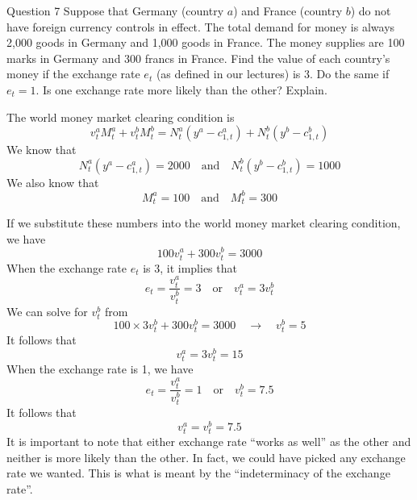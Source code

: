 \documentclass[a4paper]{article}
\newif\IfInSansMode
\numberwithin{equation}{section}
\numberwithin{figure}{section}
\begin{document}
	\begin{questionbox}{Question 7}
		Suppose that Germany (country \( a \)) and France (country \( b \)) do not have foreign currency controls in effect. The total demand for money is always 2,000 goods in Germany and 1,000 goods in France. The money supplies are 100 marks in Germany and 300 francs in France. Find the value of each country's money if the exchange rate \( e_t \) (as defined in our lectures) is 3. Do the same if \( e_t = 1 \). Is one exchange rate more likely than the other? Explain.
		\begin{explanationbox}
			The world money market clearing condition is
			\[
				v_t^aM_t^a + v_t^bM_t^b = N_t^a(y^a - c_{1,t}^a) + N_t^b(y^b - c_{1,t}^b)
			\]
			We know that
			\[
				N_t^a(y^a - c_{1,t}^a) = 2000 \quad\text{and}\quad N_t^b(y^b - c_{1,t}^b) = 1000
			\]
			We also know that
			\[
				M_t^a = 100 \quad\text{and}\quad M_t^b = 300
			\]
		\end{explanationbox}
		\begin{explanationbox}
			If we substitute these numbers into the world money market clearing condition, we have
			\[
				100 v_t^a + 300 v_t^b = 3000
			\]
			When the exchange rate \( e_t \) is 3, it implies that
			\[
				e_t = \frac{v_t^a}{v_t^b} = 3 \quad\text{or}\quad v_t^a = 3v_t^b
			\]
			We can solve for \( v_t^b \) from
			\[
				100 \times 3v_t^b + 300v_t^b = 3000 \quad\rightarrow\quad v_t^b = 5
			\]
			It follows that
			\[
				v_t^a = 3v_t^b = 15
			\]
			When the exchange rate is 1, we have
			\[
				e_t = \frac{v_t^a}{v_t^b} = 1 \quad\text{or}\quad v_t^b = 7.5
			\]
			It follows that
			\[
				v_t^a = v_t^b = 7.5
			\]
			It is important to note that either exchange rate ``works as well'' as the other and neither is more likely than the other. In fact, we could have picked any exchange rate we wanted. This is what is meant by the ``indeterminacy of the exchange rate''.
		\end{explanationbox}
	\end{questionbox}
\end{document}
